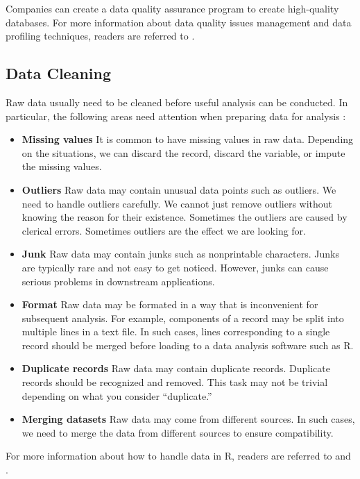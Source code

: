 \documentclass[]{book}
\theoremstyle{definition}
\theoremstyle{definition}
\theoremstyle{definition}
\theoremstyle{remark}
\begin{document}
Companies can create a data quality assurance program to create
high-quality databases. For more information about data quality issues
management and data profiling techniques, readers are referred to
\citep{olson2003}.

\subsection{Data Cleaning}\label{data-cleaning}

Raw data usually need to be cleaned before useful analysis can be
conducted. In particular, the following areas need attention when
preparing data for analysis \citep{janert2010}:

\begin{itemize}
\item
  \textbf{Missing values} It is common to have missing values in raw
  data. Depending on the situations, we can discard the record, discard
  the variable, or impute the missing values.
\item
  \textbf{Outliers} Raw data may contain unusual data points such as
  outliers. We need to handle outliers carefully. We cannot just remove
  outliers without knowing the reason for their existence. Sometimes the
  outliers are caused by clerical errors. Sometimes outliers are the
  effect we are looking for.
\item
  \textbf{Junk} Raw data may contain junks such as nonprintable
  characters. Junks are typically rare and not easy to get noticed.
  However, junks can cause serious problems in downstream applications.
\item
  \textbf{Format} Raw data may be formated in a way that is inconvenient
  for subsequent analysis. For example, components of a record may be
  split into multiple lines in a text file. In such cases, lines
  corresponding to a single record should be merged before loading to a
  data analysis software such as R.
\item
  \textbf{Duplicate records} Raw data may contain duplicate records.
  Duplicate records should be recognized and removed. This task may not
  be trivial depending on what you consider ``duplicate.''
\item
  \textbf{Merging datasets} Raw data may come from different sources. In
  such cases, we need to merge the data from different sources to ensure
  compatibility.
\end{itemize}

For more information about how to handle data in R, readers are referred
to \citep{forte2015} and \citep{buttrey2017}.
\end{document}
